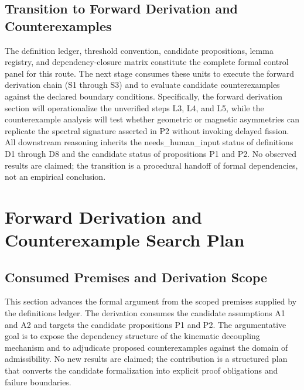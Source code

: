 \documentclass[conference]{IEEEtran}
\begin{document}
\subsection{Transition to Forward Derivation and Counterexamples}
The definition ledger, threshold convention, candidate propositions, lemma registry, and dependency-closure matrix constitute the complete formal control panel for this route. The next stage consumes these units to execute the forward derivation chain (S1 through S3) and to evaluate candidate counterexamples against the declared boundary conditions. Specifically, the forward derivation section will operationalize the unverified steps L3, L4, and L5, while the counterexample analysis will test whether geometric or magnetic asymmetries can replicate the spectral signature asserted in P2 without invoking delayed fission. All downstream reasoning inherits the needs\_human\_input status of definitions D1 through D8 and the candidate status of propositions P1 and P2. No observed results are claimed; the transition is a procedural handoff of formal dependencies, not an empirical conclusion.

\section{Forward Derivation and Counterexample Search Plan}
\subsection{Consumed Premises and Derivation Scope}
This section advances the formal argument from the scoped premises supplied by the definitions ledger. The derivation consumes the candidate assumptions A1 and A2 and targets the candidate propositions P1 and P2. The argumentative goal is to expose the dependency structure of the kinematic decoupling mechanism and to adjudicate proposed counterexamples against the domain of admissibility. No new results are claimed; the contribution is a structured plan that converts the candidate formalization into explicit proof obligations and failure boundaries.~\cite{cite_2bf3a687e25803e4,cite_2e146bff5b4a005e,cite_30c88fe46f23448d,cite_bbb76a303fab42b5}
\end{document}
